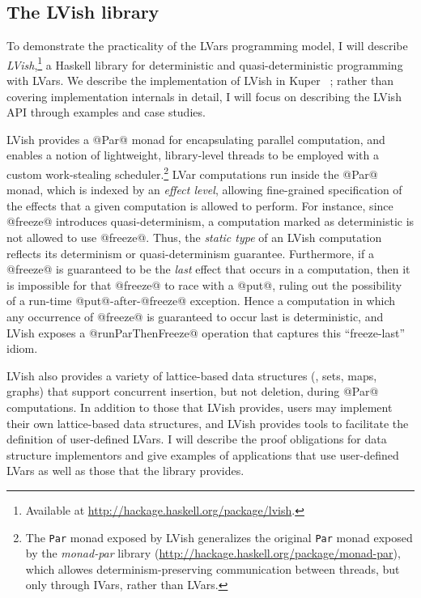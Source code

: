 \documentclass{article}
\begin{document}
\subsection{The LVish library}\label{ss:lvish}

To demonstrate the practicality of the LVars programming model, I will
describe \emph{LVish},\footnote{Available at
  \url{http://hackage.haskell.org/package/lvish}.} a Haskell library
for deterministic and quasi-deterministic programming with LVars.  We
describe the implementation of LVish in Kuper
\etal~\cite{Freeze-paper}; rather than covering implementation
internals in detail, I will focus on describing the LVish API through
examples and case studies.

LVish provides a @Par@ monad for encapsulating parallel computation,
and enables a notion of lightweight, library-level threads to be
employed with a custom work-stealing scheduler.\footnote{The
  \lstinline|Par| monad exposed by LVish generalizes the original
  \lstinline|Par| monad exposed by the \emph{monad-par} library
  ({\scriptsize\url{http://hackage.haskell.org/package/monad-par}}),
  which allowes determinism-preserving communication between threads,
  but only through IVars, rather than LVars.}  LVar computations run
inside the @Par@ monad, which is indexed by an \emph{effect level},
allowing fine-grained specification of the effects that a given
computation is allowed to perform.  For instance, since @freeze@
introduces quasi-determinism, a computation marked as deterministic is
not allowed to use @freeze@.  Thus, the \emph{static type} of an LVish
computation reflects its determinism or quasi-determinism guarantee.
Furthermore, if a @freeze@ is guaranteed to be the \emph{last} effect
that occurs in a computation, then it is impossible for that @freeze@
to race with a @put@, ruling out the possibility of a run-time
@put@-after-@freeze@ exception.  Hence a computation in which any
occurrence of @freeze@ is guaranteed to occur last is deterministic,
and LVish exposes a @runParThenFreeze@ operation that captures this
``freeze-last'' idiom.

LVish also provides a variety of lattice-based data structures (\eg,
sets, maps, graphs) that support concurrent insertion, but not
deletion, during @Par@ computations.  In addition to those that LVish
provides, users may implement their own lattice-based data structures,
and LVish provides tools to facilitate the definition of user-defined
LVars.  I will describe the proof obligations for data structure
implementors and give examples of applications that use user-defined
LVars as well as those that the library provides.
\end{document}
